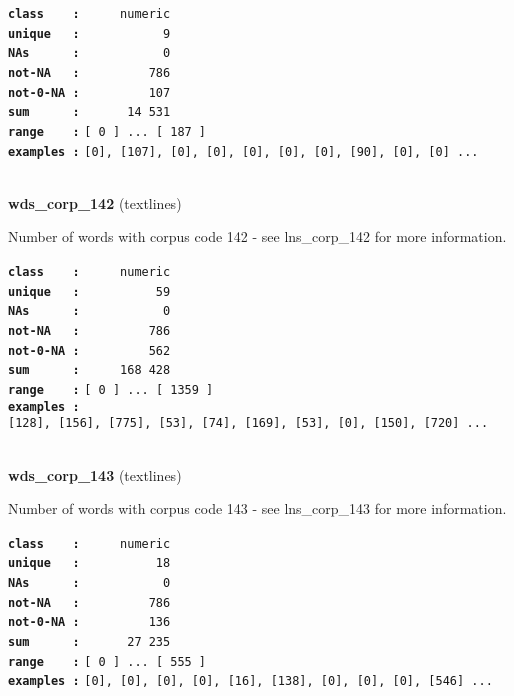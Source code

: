 \documentclass[]{article}
\begin{document}
\textbf{\texttt{class\ \ \ \ :}} \texttt{~~~~~numeric}\\
\textbf{\texttt{unique\ \ \ :}} \texttt{~~~~~~~~~~~9}\\
\textbf{\texttt{NAs\ \ \ \ \ \ :}} \texttt{~~~~~~~~~~~0}\\
\textbf{\texttt{not-NA\ \ \ :}} \texttt{~~~~~~~~~786}\\
\textbf{\texttt{not-0-NA\ :}} \texttt{~~~~~~~~~107}\\
\textbf{\texttt{sum\ \ \ \ \ \ :}} \texttt{~~~~~~14~531}\\
\textbf{\texttt{range\ \ \ \ :}}
\texttt{{[}\ 0\ {]}\ ...\ {[}\ 187\ {]}}\\
\textbf{\texttt{examples\ :}}
\texttt{{[}0{]},\ {[}107{]},\ {[}0{]},\ {[}0{]},\ {[}0{]},\ {[}0{]},\ {[}0{]},\ {[}90{]},\ {[}0{]},\ {[}0{]}\ ...}\\

~

\textbf{wds\_corp\_142} (textlines)

Number of words with corpus code 142 - see lns\_corp\_142 for more
information.

\textbf{\texttt{class\ \ \ \ :}} \texttt{~~~~~numeric}\\
\textbf{\texttt{unique\ \ \ :}} \texttt{~~~~~~~~~~59}\\
\textbf{\texttt{NAs\ \ \ \ \ \ :}} \texttt{~~~~~~~~~~~0}\\
\textbf{\texttt{not-NA\ \ \ :}} \texttt{~~~~~~~~~786}\\
\textbf{\texttt{not-0-NA\ :}} \texttt{~~~~~~~~~562}\\
\textbf{\texttt{sum\ \ \ \ \ \ :}} \texttt{~~~~~168~428}\\
\textbf{\texttt{range\ \ \ \ :}}
\texttt{{[}\ 0\ {]}\ ...\ {[}\ 1359\ {]}}\\
\textbf{\texttt{examples\ :}}
\texttt{{[}128{]},\ {[}156{]},\ {[}775{]},\ {[}53{]},\ {[}74{]},\ {[}169{]},\ {[}53{]},\ {[}0{]},\ {[}150{]},\ {[}720{]}\ ...}\\

~

\textbf{wds\_corp\_143} (textlines)

Number of words with corpus code 143 - see lns\_corp\_143 for more
information.

\textbf{\texttt{class\ \ \ \ :}} \texttt{~~~~~numeric}\\
\textbf{\texttt{unique\ \ \ :}} \texttt{~~~~~~~~~~18}\\
\textbf{\texttt{NAs\ \ \ \ \ \ :}} \texttt{~~~~~~~~~~~0}\\
\textbf{\texttt{not-NA\ \ \ :}} \texttt{~~~~~~~~~786}\\
\textbf{\texttt{not-0-NA\ :}} \texttt{~~~~~~~~~136}\\
\textbf{\texttt{sum\ \ \ \ \ \ :}} \texttt{~~~~~~27~235}\\
\textbf{\texttt{range\ \ \ \ :}}
\texttt{{[}\ 0\ {]}\ ...\ {[}\ 555\ {]}}\\
\textbf{\texttt{examples\ :}}
\texttt{{[}0{]},\ {[}0{]},\ {[}0{]},\ {[}0{]},\ {[}16{]},\ {[}138{]},\ {[}0{]},\ {[}0{]},\ {[}0{]},\ {[}546{]}\ ...}\\
\end{document}

